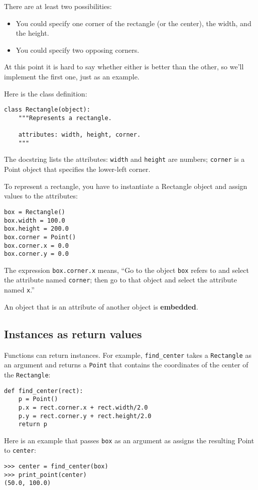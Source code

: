 \documentclass{article}
\begin{document}
\begin{multicols}{2}
There are at least two possibilities:
\begin{itemize}
    \item You could specify one corner of the rectangle (or the center),
        the width, and the height.
    \item You could specify two opposing corners.
\end{itemize}
At this point it is hard to say whether either is better than the other, so
we’ll implement the first one, just as an example.

Here is the class definition:
\begin{verbatim}
class Rectangle(object):
    """Represents a rectangle.

    attributes: width, height, corner.
    """
\end{verbatim}
The docstring lists the attributes: \verb|width| and \verb|height| are
numbers; \verb|corner| is a Point object that specifies the lower-left
corner.

To represent a rectangle, you have to instantiate a Rectangle object and
assign values to the attributes:
\begin{verbatim}
box = Rectangle()
box.width = 100.0
box.height = 200.0
box.corner = Point()
box.corner.x = 0.0
box.corner.y = 0.0
\end{verbatim}
The expression \verb|box.corner.x| means, ``Go to the object \verb|box|
refers to and select the attribute named \verb|corner|; then go to that
object and select the attribute named \verb|x|.''

An object that is an attribute of another object is \textbf{embedded}.

\subsection{Instances as return values}
Functions can return instances. For example, \verb|find_center| takes a
\verb|Rectangle| as an argument and returns a \verb|Point| that contains
the coordinates of the center of the \verb|Rectangle|:
\begin{verbatim}
def find_center(rect):
    p = Point()
    p.x = rect.corner.x + rect.width/2.0
    p.y = rect.corner.y + rect.height/2.0
    return p
\end{verbatim}
Here is an example that passes \verb|box| as an argument as assigns the
resulting Point to \verb|center|:
\begin{verbatim}
>>> center = find_center(box)
>>> print_point(center)
(50.0, 100.0)
\end{verbatim}


\end{multicols}
\end{document}
